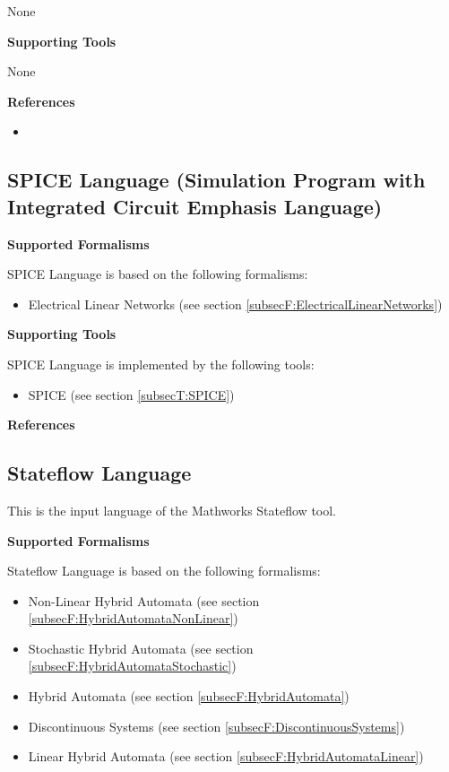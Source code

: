 None


\textbf{Supporting Tools}

None


\textbf{References}
\begin{itemize}
	
\item {}
\end{itemize}



\subsection{SPICE Language (Simulation Program with Integrated Circuit Emphasis Language)}
\label{subsecL:SPICELanguage}



\textbf{Supported Formalisms}

SPICE Language is based on the following formalisms:
\begin{itemize}
	\item Electrical Linear Networks (see section \ref{subsecF:ElectricalLinearNetworks})
\end{itemize}


\textbf{Supporting Tools}

SPICE Language is implemented by the following tools:
\begin{itemize}
	\item SPICE (see section \ref{subsecT:SPICE})
\end{itemize}


\textbf{References}




\subsection{Stateflow Language}
\label{subsecL:StateFlowLanguage}


This is the input language of the Mathworks Stateflow tool.

\textbf{Supported Formalisms}

Stateflow Language is based on the following formalisms:
\begin{itemize}
	\item Non-Linear Hybrid Automata (see section \ref{subsecF:HybridAutomataNonLinear})
	\item Stochastic Hybrid Automata (see section \ref{subsecF:HybridAutomataStochastic})
	\item Hybrid Automata (see section \ref{subsecF:HybridAutomata})
	\item Discontinuous Systems (see section \ref{subsecF:DiscontinuousSystems})
	\item Linear Hybrid Automata (see section \ref{subsecF:HybridAutomataLinear})
\end{itemize}


